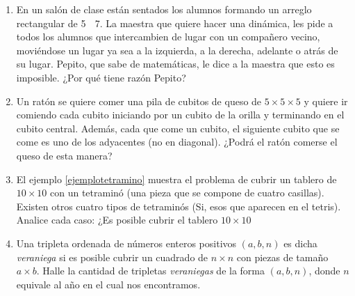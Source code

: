 \begin{enumerate}
	\item En un sal\'on de clase est\'an sentados los alumnos formando un arreglo rectangular de 5  7. La maestra
	que quiere hacer una din\'amica, les pide a todos los alumnos que intercambien de lugar con un compañero
	vecino, movi\'endose un lugar ya sea a la izquierda, a la derecha, adelante o atr\'as de su lugar. Pepito, que
	sabe de matem\'aticas, le dice a la maestra que esto es imposible. ¿Por qu\'e tiene raz\'on Pepito?
	\item Un rat\'on se quiere comer una pila de cubitos de queso de $5\times5\times5$ y quiere ir comiendo cada cubito iniciando por un cubito de la orilla y
	terminando en el cubito central. Adem\'as, cada que come un cubito, el siguiente cubito que se come es uno
	de los adyacentes (no en diagonal). ¿Podr\'a el rat\'on comerse el queso de esta manera?
	
	\item El ejemplo \ref{ejemplotetramino} muestra el problema de cubrir un tablero de $10\times 10$ con un tetramin\'o (una pieza que se compone de cuatro casillas). Existen otros cuatro tipos de tetramin\'os (Si, esos que aparecen en el tetris). Analice cada caso: ¿Es posible cubrir el tablero $10\times 10$
	
	\item Una tripleta ordenada de n\'umeros enteros positivos $(a, b, n)$ es dicha \textit{veraniega} si es posible cubrir un cuadrado de $n \times n$ con piezas de tamaño $a\times b$. Halle la cantidad de tripletas \textit{veraniegas} de la forma $(a, b, n)$, donde $n$ equivale al año en el cual nos encontramos.
\end{enumerate}
